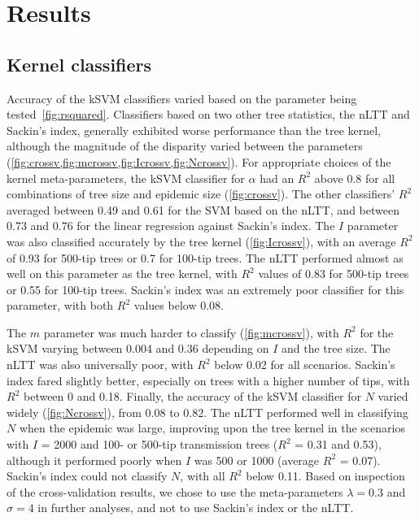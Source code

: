 \documentclass[12pt]{article}\usepackage[]{graphicx}\usepackage[]{color}
\begin{document}
\section*{Results}

\subsection*{Kernel classifiers}



Accuracy of the \gls{kSVM} classifiers varied based on the parameter being
tested~\cref{fig:rsquared}. Classifiers based on two other tree statistics, the
\gls{nLTT} and Sackin's index, generally exhibited worse performance than the
tree kernel, although the magnitude of the disparity varied between the
parameters (\cref{fig:crossv,fig:mcrossv,fig:Icrossv,fig:Ncrossv}). For
appropriate choices of the kernel meta-parameters, the kSVM classifier for
$\alpha$ had an $R^2$ above 
    0.8 
for all combinations of tree size and epidemic size (\cref{fig:crossv}). The
other classifiers' $R^2$ averaged between
  0.49
and
  0.61
for the SVM based on the \gls{nLTT}, and between
  0.73
and
  0.76
for the linear regression against Sackin's index. The $I$ parameter was also
classified accurately by the tree kernel (\cref{fig:Icrossv}), with an average
$R^2$ of 
  0.93 
for 500-tip trees or 
  0.7 
for 100-tip trees. The \gls{nLTT} performed almost as well on this parameter as
the tree kernel, with $R^2$ values of
  0.83
for 500-tip trees or
  0.55
for 100-tip trees. Sackin's index was an extremely poor classifier for this
parameter, with both $R^2$ values below
  0.08.

The $m$ parameter was much harder to classify (\cref{fig:mcrossv}), with $R^2$
for the kSVM varying between 
  0.004
and
  0.36
depending on $I$ and the tree size. The \gls{nLTT} was also universally poor,
with $R^2$ below
  0.02
for all scenarios. Sackin's index fared slightly better, especially on trees
with a higher number of tips, with $R^2$ between
  0
and
  0.18.
Finally, the accuracy of the kSVM classifier for $N$ varied widely
(\cref{fig:Ncrossv}), from 
  0.08
to
  0.82.
The \gls{nLTT} performed well in classifying $N$ when the epidemic was large,
improving upon the tree kernel in the scenarios with $I$ = 2000 and 100- or
500-tip transmission trees ($R^2$ = 
  0.31
and
  0.53),
although it performed poorly when $I$ was 500 or 1000 (average $R^2$ =
  0.07).
Sackin's index could not classify $N$, with all $R^2$ below
  0.11.
Based on inspection of the cross-validation results, we chose to use the
meta-parameters $\lambda = 0.3$ and $\sigma = 4$ in further analyses, and not
to use Sackin's index or the \gls{nLTT}.
\end{document}
